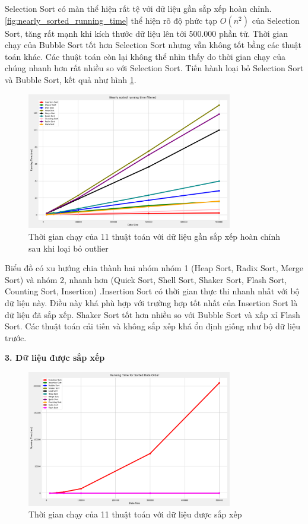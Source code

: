 Selection Sort có màn thể hiện rất tệ với dữ liệu gần sắp xếp hoàn chỉnh. \ref{fig:nearly_sorted_running_time} thể hiện rõ độ phức tạp $O(n^2)$ của Selection Sort, tăng rất mạnh khi kích thước dữ liệu lên tới 500.000 phần tử. Thời gian chạy của Bubble Sort tốt hơn Selection Sort nhưng vẫn không tốt bằng các thuật toán khác. Các thuật toán còn lại không thể nhìn thấy do thời gian chạy của chúng nhanh hơn rất nhiều so với Selection Sort. Tiến hành loại bỏ Selection Sort và Bubble Sort, kết quả như hình \ref{fig:nearly_sorted_running_time_filtered}.


\begin{figure}[H]
    \centering
    \includegraphics[width=0.8\textwidth]{experimental_result/images/nearly_sorted_running_time_filtered.png}
    \caption{Thời gian chạy của 11 thuật toán với dữ liệu gần sắp xếp hoàn chỉnh sau khi loại bỏ outlier}
    \label{fig:nearly_sorted_running_time_filtered}
\end{figure}

Biểu đồ có xu hướng chia thành hai nhóm nhóm 1 (Heap Sort, Radix Sort, Merge Sort) và nhóm 2, nhanh hơn (Quick Sort, Shell Sort, Shaker Sort, Flash Sort, Counting Sort, Insertion) .Insertion Sort có thời gian thực thi nhanh nhất với bộ dữ liệu này. Điều này khá phù hợp với trường hợp tốt nhất của Insertion Sort là dữ liệu đã sắp xếp. Shaker Sort tốt hơn nhiều so với Bubble Sort và xấp xỉ Flash Sort. Các thuật toán cải tiến và không sắp xếp khá ổn định giống như bộ dữ liệu trước.


\textbf{3. Dữ liệu được sắp xếp}

\begin{figure}[H]
    \centering
    \includegraphics[width=0.8\textwidth]{experimental_result/images/sorted_running_time.png}
    \caption{Thời gian chạy của 11 thuật toán với dữ liệu được sắp xếp}
    \label{fig:sorted_running_time}
\end{figure}


